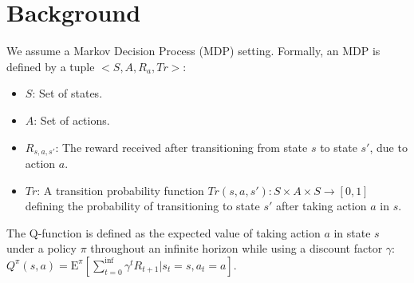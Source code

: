 \documentclass{ecai}
\begin{document}



\section{Background}
We assume a Markov Decision Process (MDP) setting. Formally, an MDP is defined by a tuple $<S, A, R_{a}, Tr>$:
\begin{itemize}
  \item $S$: Set of states.
  \item $A$: Set of actions. 
  \item $R_{s,a,s'}$: The reward received after transitioning from state $s$ to state $s'$, due to action $a$.
  \item $Tr$: A transition probability function $Tr(s,a,s'): S \times A \times S \rightarrow [0,1]$ defining the probability of transitioning to state $s'$ after taking action $a$ in $s$.
\end{itemize}
The Q-function is defined as the expected value of taking action $a$ in state $s$ under a policy $\pi$ throughout an infinite horizon while using a discount factor $\gamma$:
\\ $Q^{\pi}(s,a)= \mathrm{E}^{\pi}[\sum_{t=0}^{\inf}\gamma^{t}R_{t+1}| s_t=s,a_t=a]$.
\end{document}
